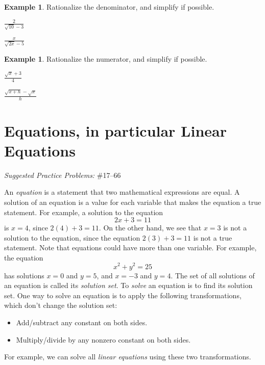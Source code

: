 \documentclass[letterpaper,12pt,oneside]{book}
\theoremstyle{definition}
\newtheorem{example}[theorem]{Example}
\newcommand{\practicesection}[2]{%
    \section{#1}
    \textit{Suggested Practice Problems:} #2
    \smallskip%
}
\begin{document}
\begin{example}
Rationalize the denominator, and simplify if possible.
\begin{enumerate}
\begin{multicols}{2}
\item $\displaystyle\frac{2}{\sqrt{10}-3}$
\item $\displaystyle\frac{x}{\sqrt{2x}-5}$
\end{multicols}
\vfill
\end{enumerate}
\end{example}

\begin{example}
Rationalize the numerator, and simplify if possible.
\begin{enumerate}
\begin{multicols}{2}
\item $\displaystyle\frac{\sqrt{x}+3}{4}$
\item $\displaystyle\frac{\sqrt{x+h}-\sqrt{x}}{h}$
\end{multicols}
\vfill
\end{enumerate}
\end{example}

\newpage

\practicesection{Equations, in particular Linear Equations}{\#17--66}

\noindent
An \emph{equation} is a statement that two mathematical expressions are equal.  A solution of an equation is a value for each variable that makes the equation a true statement.  For example, a solution to the equation
\[
2x+3=11
\]
is $x=4$, since $2(4)+3=11$.  On the other hand, we see that $x=3$ is not a solution to the equation, since the equation $2(3)+3= 11$ is not a true statement.  Note that equations could have more than one variable.  For example, the equation
\[
x^2+y^2=25
\]
has solutions $x=0$ and $y=5$, and $x=-3$ and $y=4$.  The set of all solutions of an equation is called its \emph{solution set}.  To \emph{solve} an equation is to find its solution set.  One way to solve an equation is to apply the following transformations, which don't change the solution set:
\begin{itemize}
\item Add/subtract any constant on both sides.
\item Multiply/divide by any nonzero constant on both sides.
\end{itemize}
For example, we can solve all \emph{linear equations} using these two transformations.
\end{document}

